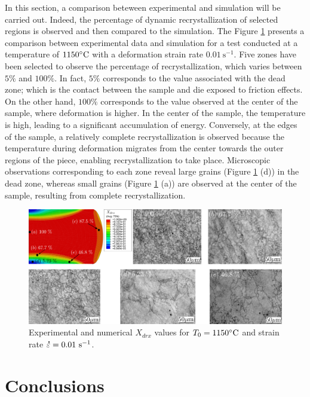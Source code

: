 \documentclass[metals,article,submit,pdftex,moreauthors]{Definitions/mdpi}
\DeclareRobustCommand{\mdot}[1]{\accentset{\mbox{\bfseries .}}{#1}}
\DeclareRobustCommand{\ps}{\text{s}^{-1}}
\begin{document}
In this section, a comparison beteween experimental and simulation will be carried out.
Indeed, the percentage of dynamic recrystallization of selected regions is observed and then compared to the simulation.
The Figure \ref{fig:expNumDRX} presents a comparison between experimental data and simulation for a test conducted at a temperature of $1150\celsius$ with a deformation strain rate $0.01~\ps$.
Five zones have been selected to observe the percentage of recrystallization, which varies between $5\%$ and $100\%$.
In fact, $5\%$ corresponds to the value associated with the dead zone; which is the contact between the sample and die exposed to friction effects.
On the other hand, $100\%$ corresponds to the value observed at the center of the sample, where deformation is higher.
In the center of the sample, the temperature is high, leading to a significant accumulation of energy.
Conversely, at the edges of the sample, a relatively complete recrystallization is observed because the temperature during deformation migrates from the center towards the outer regions of the piece, enabling recrystallization to take place.
Microscopic observations corresponding to each zone reveal large grains (Figure \ref{fig:expNumDRX} (d)) in the dead zone, whereas small grains (Figure \ref{fig:expNumDRX} (a)) are observed at the center of the sample, resulting from complete recrystallization.
\begin{figure}[H]
\centering
\includegraphics[width=0.98\columnwidth]{Figures/expNumDRX}
\caption{Experimental and numerical $X_{drx}$ values for $T_0=1150\celsius$ and strain rate $\mdot{\varepsilon}=0.01~\ps$.}
\label{fig:expNumDRX}
\end{figure}

\section{Conclusions\label{sec:Conclusions}}
\end{document}
